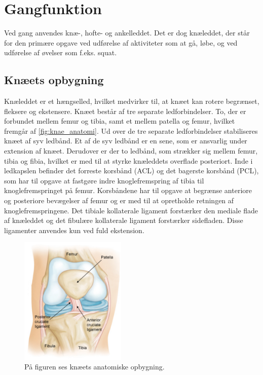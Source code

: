 \section{Gangfunktion}
Ved gang anvendes knæ-, hofte- og ankelleddet. Det er dog knæleddet, der står for den primære opgave ved udførelse af aktiviteter som at gå, løbe, og ved udførelse af øvelser som f.eks. squat. 

\subsection{Knæets opbygning}
Knæleddet er et hængselled, hvilket medvirker til, at knæet kan rotere begrænset, fleksere og ekstensere. Knæet består af tre separate ledforbindelser. To, der er forbundet mellem femur og tibia, samt et mellem patella og femur, hvilket fremgår af \autoref{fig:knae_anatomi}. Ud over de tre separate ledforbindelser stabiliseres knæet af syv ledbånd. Et af de syv ledbånd er en sene, som er ansvarlig under extension af knæet. Derudover er der to ledbånd, som strækker sig mellem femur, tibia og fibia, hvilket er med til at styrke knæleddets overflade posteriort. Inde i ledkapslen befinder det forreste korsbånd (ACL) og det bagerste korsbånd (PCL), som har til opgave at fastgøre indre knoglefremspring af tibia til knoglefremspringet på femur. Korsbåndene har til opgave at begrænse anteriore og posteriore bevægelser af femur og er med til at opretholde retningen af knoglefremspringene. Det tibiale kollaterale ligament forstærker den mediale flade af knæleddet og det fibulære kollaterale ligament forstærker sidefladen. Disse ligamenter anvendes kun ved fuld ekstension.\citep{martini2012} 

\begin{figure}[H]
\centering
\includegraphics[width=0.45\textwidth]{figures/knae_anatomi}
\caption{På figuren ses knæets anatomiske opbygning.}%
\label{fig:knae_anatomi}
\end{figure} 

